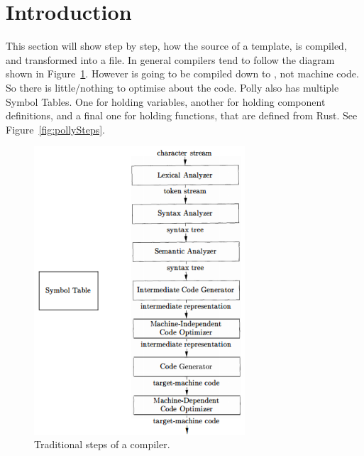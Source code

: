 \section{Introduction}
This section will show step by step, how the source of a \languageName{} template, is compiled, and transformed into a  file. In general compilers tend to follow the diagram shown in Figure~\ref{fig:compilerSteps}. However \languageName{} is going to be compiled down to , not machine code. So there is little/nothing to optimise about the code. Polly also has multiple Symbol Tables. One for holding variables, another for holding component definitions, and a final one for holding functions, that are defined from Rust. See Figure~\ref{fig:pollySteps}.

\begin{figure}[!htbp]
    \centerline{\includegraphics[width=0.7\textwidth]{img/compiler_steps.png}}
    \caption{Traditional steps of a compiler\cite{DragonBook}.}
    \label{fig:compilerSteps}
\end{figure}

